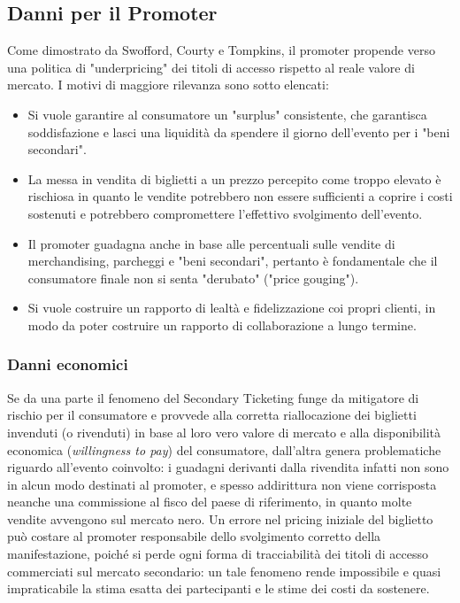 \subsection{Danni per il Promoter}
Come dimostrato da Swofford, Courty e Tompkins, il promoter propende verso una politica di "underpricing" dei titoli di accesso rispetto al reale valore di mercato. I motivi di maggiore rilevanza sono sotto elencati: 
\begin{itemize}
\item Si vuole garantire al consumatore un "surplus" consistente, che garantisca soddisfazione e lasci una liquidità da spendere il giorno dell'evento per i "beni secondari".
\item La messa in vendita di biglietti a un prezzo percepito come troppo elevato è rischiosa in quanto le vendite potrebbero non essere sufficienti a coprire i costi sostenuti e potrebbero compromettere l'effettivo svolgimento dell'evento. 
\item Il promoter guadagna anche in base alle percentuali sulle vendite di merchandising, parcheggi e "beni secondari", pertanto è fondamentale che il consumatore finale non si senta "derubato" ("price gouging").
\item Si vuole costruire un rapporto di lealtà e fidelizzazione coi propri clienti, in modo da poter costruire un rapporto di collaborazione a lungo termine.
\end{itemize}
\subsubsection{Danni economici}
Se da una parte il fenomeno del Secondary Ticketing funge da mitigatore di rischio \cite{geloso2014ticket} per il consumatore e provvede alla corretta riallocazione dei biglietti invenduti (o rivenduti) in base al loro vero valore di mercato e alla disponibilità economica (\textit{willingness to pay}) del consumatore, dall'altra genera problematiche riguardo all'evento coinvolto: i guadagni derivanti dalla rivendita infatti non sono in alcun modo destinati al promoter, e spesso addirittura non viene corrisposta neanche una commissione al fisco del paese di riferimento, in quanto molte vendite avvengono sul mercato nero. 
Un errore nel pricing iniziale del biglietto può costare al promoter responsabile dello svolgimento corretto della manifestazione, poiché si perde ogni forma di tracciabilità dei titoli di accesso commerciati sul mercato secondario: un tale fenomeno rende impossibile e quasi impraticabile la stima esatta dei partecipanti e le stime dei costi da sostenere.
